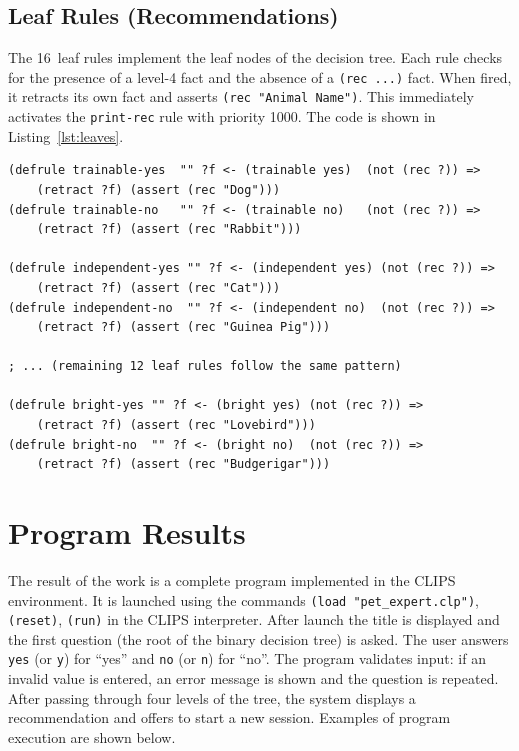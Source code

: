 \documentclass[a4paper,final]{article}
\begin{document}
\subsection{Leaf Rules (Recommendations)}

The 16~leaf rules implement the leaf nodes of the decision tree. Each rule checks for the presence of a level-4 fact and the absence of a \texttt{(rec~...)} fact. When fired, it retracts its own fact and asserts \texttt{(rec "Animal Name")}. This immediately activates the \texttt{print-rec} rule with priority 1000. The code is shown in Listing~\ref{lst:leaves}.

\begin{lstlisting}[language=CLIPS,
	caption={Leaf rules (fragment)},
	label=lst:leaves]
(defrule trainable-yes  "" ?f <- (trainable yes)  (not (rec ?)) =>
    (retract ?f) (assert (rec "Dog")))
(defrule trainable-no   "" ?f <- (trainable no)   (not (rec ?)) =>
    (retract ?f) (assert (rec "Rabbit")))

(defrule independent-yes "" ?f <- (independent yes) (not (rec ?)) =>
    (retract ?f) (assert (rec "Cat")))
(defrule independent-no  "" ?f <- (independent no)  (not (rec ?)) =>
    (retract ?f) (assert (rec "Guinea Pig")))

; ... (remaining 12 leaf rules follow the same pattern)

(defrule bright-yes "" ?f <- (bright yes) (not (rec ?)) =>
    (retract ?f) (assert (rec "Lovebird")))
(defrule bright-no  "" ?f <- (bright no)  (not (rec ?)) =>
    (retract ?f) (assert (rec "Budgerigar")))
\end{lstlisting}


\clearpage
\section{Program Results}

The result of the work is a complete program implemented in the CLIPS environment. It is launched using the commands \texttt{(load "pet\_expert.clp")}, \texttt{(reset)}, \texttt{(run)} in the CLIPS interpreter. After launch the title is displayed and the first question (the root of the binary decision tree) is asked. The user answers \texttt{yes} (or \texttt{y}) for ``yes'' and \texttt{no} (or \texttt{n}) for ``no''. The program validates input: if an invalid value is entered, an error message is shown and the question is repeated. After passing through four levels of the tree, the system displays a recommendation and offers to start a new session. Examples of program execution are shown below.
\end{document}
